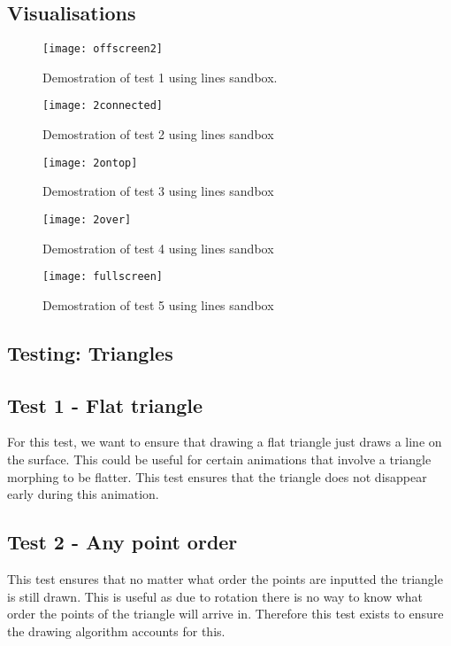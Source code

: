 \documentclass[
	a4paper, %
	10pt, %
]{CSUniSchoolLabReport}
\begin{document}
\subsection*{Visualisations}
\begin{figure}[H]
	\centering
	\begin{minipage}[b]{0.4\textwidth}
		\texttt{[image: offscreen2]}
		\caption{Demostration of test 1 using lines sandbox.}
	\end{minipage}
	\hfill
	\begin{minipage}[b]{0.4\textwidth}
		\texttt{[image: 2connected]}
		\caption{Demostration of test 2 using lines sandbox}
  	\end{minipage}
\end{figure}
\begin{figure}[H]
	\centering
	\begin{minipage}[b]{0.4\textwidth}
		\texttt{[image: 2ontop]}
		\caption{Demostration of test 3 using lines sandbox}
	\end{minipage}
	\hfill
	\begin{minipage}[b]{0.4\textwidth}
		\texttt{[image: 2over]}
		\caption{Demostration of test 4 using lines sandbox}
  	\end{minipage}
\end{figure}
\begin{figure}[H]
	\centering
	\texttt{[image: fullscreen]}
	\caption{Demostration of test 5 using lines sandbox}	
\end{figure}
\subsection{Testing: Triangles}
\subsection*{Test 1 {-} Flat triangle}
For this test, we want to ensure that drawing a flat triangle just draws a line on the surface.
This could be useful for certain animations that involve a triangle morphing to be flatter. 
This test ensures that the triangle does not disappear early during this animation.
\subsection*{Test 2 {-} Any point order}
This test ensures that no matter what order the points are inputted the triangle is still drawn.
This is useful as due to rotation there is no way to know what order the points of the triangle will 
arrive in. Therefore this test exists to ensure the drawing algorithm accounts for this.
\end{document}
